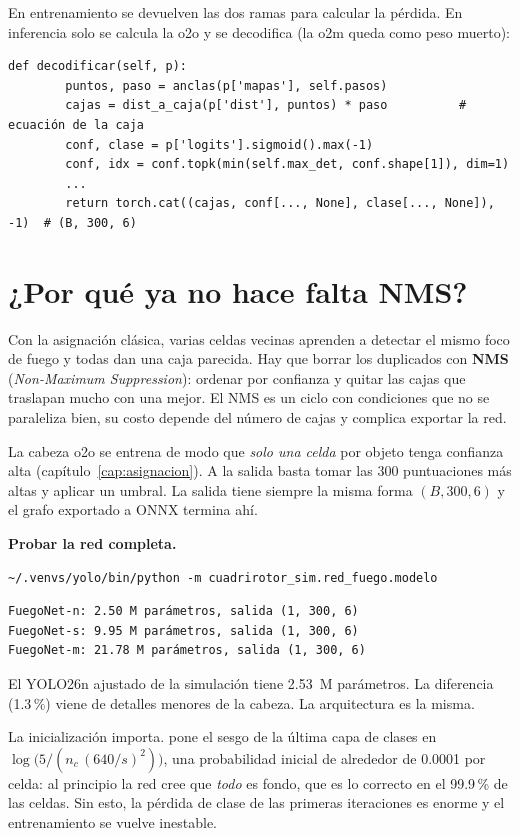 En entrenamiento se devuelven las dos ramas para calcular la pérdida. En
inferencia solo se calcula la o2o y se decodifica (la o2m queda como peso muerto):

\begin{lstlisting}[style=py]
    def decodificar(self, p):
        puntos, paso = anclas(p['mapas'], self.pasos)
        cajas = dist_a_caja(p['dist'], puntos) * paso          # ecuación de la caja
        conf, clase = p['logits'].sigmoid().max(-1)
        conf, idx = conf.topk(min(self.max_det, conf.shape[1]), dim=1)
        ...
        return torch.cat((cajas, conf[..., None], clase[..., None]), -1)  # (B, 300, 6)
\end{lstlisting}

\section{¿Por qué ya no hace falta NMS?}

Con la asignación clásica, varias celdas vecinas aprenden a detectar el mismo
foco de fuego y todas dan una caja parecida. Hay que borrar los duplicados con
\textbf{NMS} (\emph{Non-Maximum Suppression}): ordenar por confianza y quitar las
cajas que traslapan mucho con una mejor. El NMS es un ciclo con condiciones que
no se paraleliza bien, su costo depende del número de cajas y complica exportar
la red.

La cabeza o2o se entrena de modo que \emph{solo una celda} por objeto tenga
confianza alta (capítulo~\ref{cap:asignacion}). A la salida basta tomar las 300
puntuaciones más altas y aplicar un umbral. La salida tiene siempre la misma
forma $(B, 300, 6)$ y el grafo exportado a ONNX termina ahí.

 \textbf{Probar la red completa.}
\begin{lstlisting}[style=bash]
~/.venvs/yolo/bin/python -m cuadrirotor_sim.red_fuego.modelo
\end{lstlisting}
\begin{resultado}
\begin{lstlisting}
FuegoNet-n: 2.50 M parámetros, salida (1, 300, 6)
FuegoNet-s: 9.95 M parámetros, salida (1, 300, 6)
FuegoNet-m: 21.78 M parámetros, salida (1, 300, 6)
\end{lstlisting}
El YOLO26n ajustado de la simulación tiene 2.53~M parámetros. La diferencia
(1.3\,\%) viene de detalles menores de la cabeza. La arquitectura es la misma.
\end{resultado}

\begin{nota}
La inicialización importa.  pone el sesgo de la última capa
de clases en $\log\!\big(5 / (n_c\,(640/s)^2)\big)$, una probabilidad inicial de
alrededor de 0.0001 por celda: al principio la red cree que \emph{todo} es fondo,
que es lo correcto en el 99.9\,\% de las celdas. Sin esto, la pérdida de clase de
las primeras iteraciones es enorme y el entrenamiento se vuelve inestable.
\end{nota}
